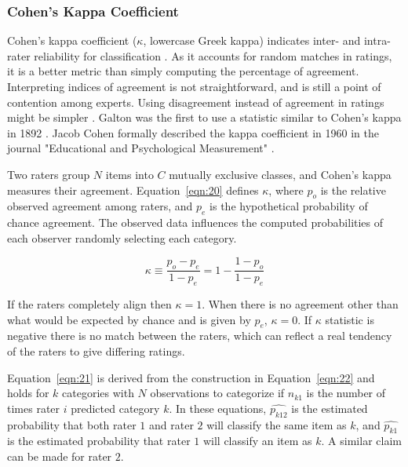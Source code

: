 \documentclass[sn-mathphys-num]{sn-jnl}%
\begin{document}
\subsubsection{Cohen's Kappa Coefficient}

Cohen's kappa coefficient ($\kappa$, lowercase Greek kappa) indicates inter- and intra-rater reliability for classification \cite{mchugh2012interrater}. As it accounts for random matches in ratings, it is a better metric than simply computing the percentage of agreement. Interpreting indices of agreement is not straightforward, and is still a point of contention among experts. Using disagreement instead of agreement in ratings might be simpler \cite{pontius2011death}. Galton was the first to use a statistic similar to Cohen's kappa in 1892 \cite{galton1892finger, smeeton1985early}. Jacob Cohen formally described the kappa coefficient in 1960 in the journal "Educational and Psychological Measurement" \cite{cohen1960coefficient}.

Two raters group $N$ items into $C$ mutually exclusive classes, and Cohen's kappa measures their agreement. Equation~\ref{eqn:20} defines $\kappa$, where $p_{o}$ is the relative observed agreement among raters, and $p_{e}$ is the hypothetical probability of chance agreement. The observed data influences the computed probabilities of each observer randomly selecting each category.

\begin{equation}
	\kappa \equiv {\frac {p_{o}-p_{e}}{1-p_{e}}}=1-{\frac {1-p_{o}}{1-p_{e}}}
	\label{eqn:20}
\end{equation}

If the raters completely align then $\kappa = 1$. When there is no agreement other than what would be expected by chance and is given by $p_{e}$, $\kappa = 0$. If $\kappa$ statistic is negative \cite{sim2005kappa} there is no match between the raters, which can reflect a real tendency of the raters to give differing ratings.

Equation~\ref{eqn:21} is derived from the construction in Equation~\ref{eqn:22} and holds for $k$ categories with $N$ observations to categorize if $n_{k1}$ is the number of times rater $i$ predicted category $k$. In these equations, ${\widehat{p_{k12}}}$ is the estimated probability that both rater $1$ and rater $2$ will classify the same item as $k$, and ${\widehat {p_{k1}}}$ is the estimated probability that rater $1$ will classify an item as $k$. A similar claim can be made for rater $2$.
\end{document}
